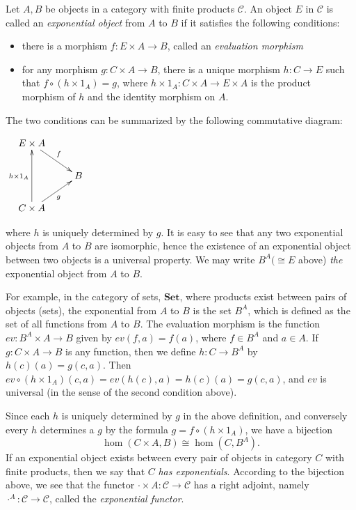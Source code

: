 Let $A,B$ be objects in a category with finite products $\mathcal{C}$.  An object $E$ in $\mathcal{C}$ is called an \emph{exponential object} from $A$ to $B$ if it satisfies the following conditions:
\begin{itemize}
\item there is a morphism $f:E\times A\to B$, called an \emph{evaluation morphism}
\item for any morphism $g:C\times A\to B$, there is a unique morphism $h:C\to E$ such that $f\circ (h\times 1_A)=g$, where $h\times 1_A:C\times A\to E\times A$ is the product morphism of $h$ and the identity morphism on $A$.
\end{itemize}
The two conditions can be summarized by the following commutative diagram:
\begin{center}
$
\xymatrix@R-=20pt{
E\times A\ar[dr]^f\\
&B\\
C\times A\ar[ur]_g\ar[uu]^{h\times 1_A}
}
$
\end{center}
where $h$ is uniquely determined by $g$.  It is easy to see that any two exponential objects from $A$ to $B$ are isomorphic, hence the existence of an exponential object between two objects is a universal property.  We may write $B^A (\cong E$ above) \emph{the} exponential object from $A$ to $B$.

For example, in the category of sets, $\textbf{Set}$, where products exist between pairs of objects (sets), the exponential from $A$ to $B$ is the set $B^A$, which is defined as the set of all functions from $A$ to $B$.  The evaluation morphism is the function $ev: B^A\times A\to B$ given by $ev(f,a)=f(a)$, where $f\in B^A$ and $a\in A$.  If $g:C\times A\to B$ is any function, then we define $h:C\to B^A$ by $h(c)(a)=g(c,a)$.  Then $ev\circ (h\times 1_A)(c,a)=ev(h(c),a)=h(c)(a)=g(c,a)$, and $ev$ is universal (in the sense of the second condition above).

Since each $h$ is uniquely determined by $g$ in the above definition, and conversely every $h$ determines a $g$ by the formula $g=f\circ (h\times 1_A)$, we have a bijection 
$$
\hom(C\times A,B)\cong \hom(C,B^A).
$$
If an exponential object exists between every pair of objects in category $C$ with finite products, then we say that $C$ \emph{has exponentials}.  According to the bijection above, we see that the functor $\cdot\times A:\mathcal{C}\to \mathcal{C}$ has a right adjoint, namely $\cdot ^A:\mathcal{C}\to\mathcal{C}$, called the \emph{exponential functor}.